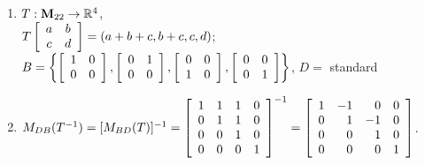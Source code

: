 \begin{multicols}{1}
\begin{ex}
\begin{enumerate}[label={\alph*.}]
\item $T : \textbf{M}_{22} \to \mathbb{R}^4$, \\ $T\left[ \begin{array}{cc} a & b \\ c & d \end{array} \right] = (a + b + c, b + c, c, d)$; \\
\hspace*{-2em}$B = \left\{ \left[ \begin{array}{rr} 1 & 0 \\ 0 & 0 \end{array} \right], \left[ \begin{array}{rr} 0 & 1 \\ 0 & 0 \end{array} \right], \left[ \begin{array}{rr} 0 & 0 \\ 1 & 0 \end{array} \right], \left[ \begin{array}{rr} 0 & 0 \\ 0 & 1 \end{array} \right] \right\}$, $D = $ standard


\end{enumerate}
\begin{sol}
\begin{enumerate}[label={\alph*.}]
\setcounter{enumi}{1}
\item $M_{DB}(T^{-1}) = [M_{BD}(T)]^{-1} =  \left[ \begin{array}{rrrr} 1 & 1 & 1 & 0 \\ 0 & 1 & 1 & 0 \\ 0 & 0 & 1 & 0 \\ 0 & 0 & 0 & 1 \end{array} \right]^{-1} = \left[ \begin{array}{rrrr} 1 & -1 & 0 & 0 \\ 0 & 1 & -1 & 0 \\ 0 & 0 & 1 & 0 \\ 0 & 0 & 0 & 1 \end{array} \right]$.


\end{enumerate}
\end{sol}
\end{ex}
\end{multicols}
